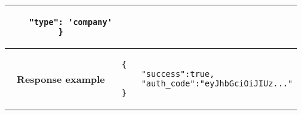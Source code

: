 \begin{adjustwidth}{1cm}{}
\begin{longtable}{|c|l|}
\begin{minipage}[t]{0.5\textwidth}
\begin{adjustwidth}{1.5cm}{}
\begin{verbatim}
    "type": 'company'
}
                \end{verbatim}
                \end{adjustwidth}
              \end{minipage} \\
              \hline
             \textbf{Response example} & 
              \begin{minipage}[t]{0.5\textwidth}
                \begin{adjustwidth}{1.5cm}{}
                \begin{verbatim}
{
    "success":true, 
    "auth_code":"eyJhbGciOiJIUz..."
}
                \end{verbatim}
                \end{adjustwidth}
              \end{minipage} \\
              \hline
        \end{longtable}
    \end{adjustwidth}

